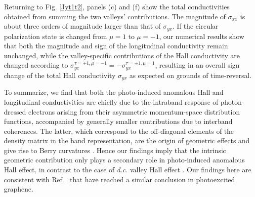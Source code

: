 \documentclass[reprint,amsmath,amssymb,aps,prb]{revtex4-1}
\begin{document}
Returning to Fig. \ref{Jyt1t2}, panels (c) and (f) show the total conductivities obtained from summing the two valleys' contributions. The magnitude of $\sigma_{xx}$ is about three orders of magnitude larger than that of $\sigma_{yx}$. If the circular polarization state is changed from $\mu = 1$ to $\mu = -1$, our numerical results show that both the magnitude and sign of the longitudinal conductivity remain unchanged, while the valley-specific contributions of the Hall conductivity are changed according to $\sigma_{yx}^{\tau=\mp1,\mu=-1}=-\sigma_{yx}^{\tau=\pm 1,\mu=1}$, resulting in an overall sign change of the total Hall conductivity $\sigma_{yx}$ as expected on  grounds of time-reversal.

To summarize, we find that both the photo-induced anomalous Hall and longitudinal conductivities are chiefly due to the intraband response of photon-dressed electrons arising from their asymmetric momentum-space distribution functions, accompanied by generally smaller contributions due to interband coherences. The latter, which correspond to the off-diagonal elements of the density matrix in the band representation, are the origin of geometric effects and give rise to Berry curvatures \cite{Berry1,Berry2,Berry3}. Hence our findings imply that the intrinsic geometric contribution only plays a secondary role in photo-induced anomalous Hall effect, in contrast to the case of \textit{d.c.} valley Hall effect \cite{valley_Niu_1,xiao2012coupled}. Our findings here are consistent with Ref.~\cite{AHE_Exp8} that have reached a similar conclusion in photoexcited graphene.  

\end{document}
